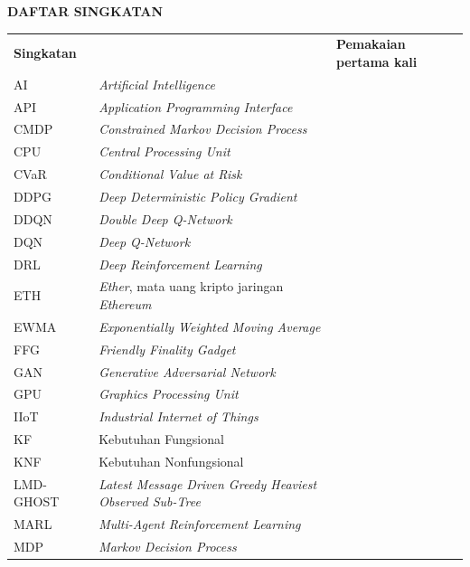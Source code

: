 \cleardoublepage
\vspace{2cm}
\begin{center}
{\fontsize{14}{16.8}\selectfont\textbf{DAFTAR SINGKATAN}}\\[1em]
\end{center}
\label{chap:singkatan}
\setcounter{chapter}{0}
\setcounter{section}{0}
\vspace{2em}

\begin{longtable}{@{} l >{\raggedright\arraybackslash}p{7.0cm} c @{}}
\multicolumn{1}{l}{\textbf{Singkatan}} & \multicolumn{1}{l}{\textbf{Deskripsi}} & \multicolumn{1}{l}{\parbox[c]{3.5cm}{\raggedright \textbf{Pemakaian pertama kali}}} \\

AI & \textit{Artificial Intelligence} & \\
API & \textit{Application Programming Interface} & \\
CMDP & \textit{Constrained Markov Decision Process} & \\
CPU & \textit{Central Processing Unit} & \\
CVaR & \textit{Conditional Value at Risk} & \\
DDPG & \textit{Deep Deterministic Policy Gradient} & \\
DDQN & \textit{Double Deep Q-Network} & \\
DQN & \textit{Deep Q-Network} & \\
DRL & \textit{Deep Reinforcement Learning} & \\
ETH & \textit{Ether}, mata uang kripto jaringan \textit{Ethereum} & \\
EWMA & \textit{Exponentially Weighted Moving Average} & \\
FFG & \textit{Friendly Finality Gadget} & \\
GAN & \textit{Generative Adversarial Network} & \\
GPU & \textit{Graphics Processing Unit} & \\
IIoT & \textit{Industrial Internet of Things} & \\
KF & Kebutuhan Fungsional & \\
KNF & Kebutuhan Nonfungsional & \\
LMD-GHOST & \textit{Latest Message Driven Greedy Heaviest Observed Sub-Tree} & \\
MARL & \textit{Multi-Agent Reinforcement Learning} & \\
MDP & \textit{Markov Decision Process} & \\

\end{longtable}
